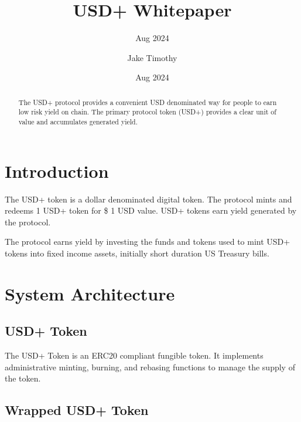 \documentclass[sigconf,nonacm,prologue,table]{acmart}
\begin{document}
\title{USD+ Whitepaper}
\subtitle{Aug 2024}
\date{Aug 2024}

\author{Jake Timothy}
\affiliation{}

\begin{teaserfigure}
\caption*{
    \hspace{\textwidth}
    }
\end{teaserfigure}

\renewcommand{\shortauthors}{Timothy}

\begin{abstract}

    The USD+ protocol provides a convenient USD denominated way for people to earn low risk yield on chain. The primary protocol token (USD+) provides a clear unit of value and accumulates generated yield.

\end{abstract}

\maketitle

\section{Introduction}
\label{sec:introduction}

The USD+ token is a dollar denominated digital token. The protocol mints and redeems 1 USD+ token for \$ 1 USD value. USD+ tokens earn yield generated by the protocol.

The protocol earns yield by investing the funds and tokens used to mint USD+ tokens into fixed income assets, initially short duration US Treasury bills. 

\section{System Architecture} 
\label{sec:system}

\subsection{USD+ Token}

The USD+ Token is an ERC20 compliant fungible token. It implements administrative minting, burning, and rebasing functions to manage the supply of the token.

\subsection{Wrapped USD+ Token}
\end{document}
